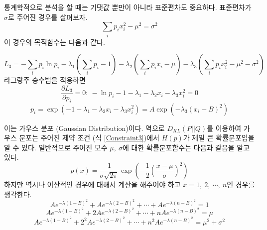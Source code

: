 


통계학적으로 분석을 할 때는 기댓값 뿐만이 아니라 표준편차도 중요하다. 표준편차가 $\sigma$로 주어진 경우를 살펴보자.
\begin{equation}
    \sum_{i} p_{i}x_{i}^{2} - \mu^{2} = \sigma^{2}
    \label{Constraint3}
\end{equation}
이 경우의 목적함수는 다음과 같다.

\begin{equation}
    L_{3} = -\sum_{i} p_{i} \ln{p_{i}} - \lambda_{1} ( \sum_{i} p_{i} - 1) - \lambda_{2} (\sum_{i} p_{i}x_{i} - \mu) - \lambda_{3}(\sum_{i} p_{i}x_{i}^{2} - \mu^{2} - \sigma^{2})
    \label{L_III}
\end{equation}
라그랑주 승수법을 적용하면
\begin{equation}
    \frac{{\partial L_{3}}}{\partial p_{i}} = 0:~ -\ln{p_{i}} - 1 - \lambda_{1} - \lambda_{2} x_{i} - \lambda_{3} x_{i}^{2} = 0
    \label{Lagrange_III}
\end{equation}
\begin{equation}
    p_{i} = \exp{(-1-\lambda_{1} - \lambda_{2} x_{i} - \lambda_{3} x_{i}^{2})} = A \exp{(-\lambda_{3} (x_{i} - B)^{2})}
    \label{p_i(Lagrange_III)}
\end{equation}

이는 가우스 분포 (Gaussian Distribution)이다. 역으로 $D_{KL}(P||Q)$를 이용하여 가우스 분포는 주어진 제약 조건 (식 \ref{Constraint3})에서 $H(p)$가 제일 큰 확률분포임을 알 수 있다. 일반적으로 주어진 모수 $\mu,~\sigma$에 대한 확률분포함수는 다음과 같음을 알고 있다.
\begin{equation}
    p(x) = \frac{1}{\sigma\sqrt{2\pi}}\exp{(-\frac{1}{2}(\frac{x-\mu}{\sigma})^{2})}
\end{equation}
하지만 역시나 이산적인 경우에 대해서 계산을 해주어야 하고 $x=1, ~2, ~\cdots, ~n$인 경우를 생각한다.
\begin{equation}
    A e^{-\lambda (1 - B)^{2}} + A e^{-\lambda (2 - B)^{2}} + \cdots + A e^{-\lambda (n - B)^{2}} = 1
\end{equation}
\begin{equation}
    A e^{-\lambda (1 - B)^{2}} + 2A e^{-\lambda (2 - B)^{2}} + \cdots + nA e^{-\lambda (n - B)^{2}} = \mu
\end{equation}
\begin{equation}
    A e^{-\lambda (1 - B)^{2}} + 2^2 A e^{-\lambda (2 - B)^{2}} + \cdots + n^2 A e^{-\lambda (n - B)^{2}} = \mu^2 + \sigma^2
\end{equation}

